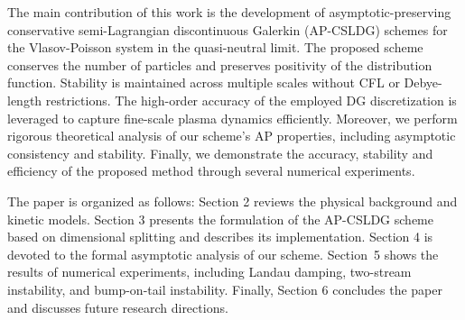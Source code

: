 \documentclass[letterpaper,10pt]{article}
\numberwithin{equation}{section}
\numberwithin{figure}{section}
\numberwithin{table}{section}
\begin{document}

The main contribution of this work is the development of asymptotic-preserving conservative semi-Lagrangian discontinuous Galerkin (AP-CSLDG) schemes for the  Vlasov-Poisson system in the quasi-neutral limit.
The proposed scheme conserves the number of particles and preserves positivity of the distribution function. Stability is maintained across multiple scales without CFL or Debye-length restrictions. The high-order accuracy of the employed DG discretization is leveraged to capture fine-scale plasma dynamics efficiently.
Moreover, we perform rigorous theoretical analysis of our scheme's AP properties, including asymptotic consistency and stability.
Finally, we demonstrate the accuracy, stability and efficiency of the proposed method through several numerical experiments.
% 

The paper is organized as follows: Section 2 reviews the physical background and kinetic models. Section 3 presents the formulation of the  AP-CSLDG scheme based on dimensional splitting and describes its implementation. Section 4 is devoted to the formal asymptotic analysis of our scheme. Section~5 shows the results of numerical experiments, including Landau damping, two-stream instability, and bump-on-tail instability. Finally, Section 6 concludes the paper and discusses future research directions.


\end{document}

